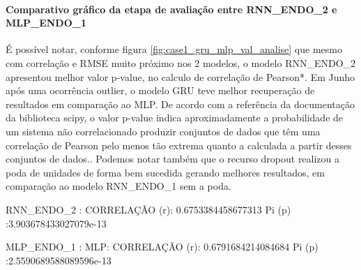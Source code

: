 \documentclass[	12pt, Times, openright, twoside, a4paper, english, brazil]{abntex2}
\begin{document}
                \paragraph{Comparativo gráfico da etapa de avaliação entre RNN\_ENDO\_2 e MLP\_ENDO\_1}
                
                  É possível notar, conforme figura \ref{fig:case1_gru_mlp_val_analise} que mesmo com correlação e RMSE muito próximo nos 2 modelos, o modelo RNN\_ENDO\_2 apresentou melhor valor p-value, no calculo de correlação de Pearson*. 
                  Em Junho após uma ocorrência outlier, o modelo GRU teve melhor recuperação de resultados em comparação ao MLP.
                  De acordo com a referência da documentação da biblioteca scipy, o valor p-value indica aproximadamente a probabilidade de um sistema não correlacionado produzir conjuntos de dados que têm uma correlação de Pearson pelo menos tão extrema quanto a calculada a partir desses conjuntos de dados.\newline.
                  Podemos notar também que o recurso dropout realizou a poda de unidades de forma bem sucedida gerando melhores resultados, em comparação ao modelo RNN\_ENDO\_1 sem a poda.
                    
                  RNN\_ENDO\_2 :\newline 
                  CORRELAÇÃO (r): 0.6753384458677313 \newline
                  Pi (p) :3.903678433027079e-13
                  
                  MLP\_ENDO\_1 :\newline 
                  MLP: CORRELAÇÃO (r): 0.6791684214084684 \newline
                  Pi (p) :2.5590689588089596e-13\newline
                  \begin{figure}[H]
                    \end{figure}
\end{document}
